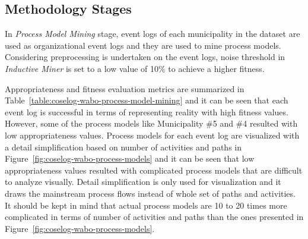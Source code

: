 \subsection{Methodology Stages}
\label{sec:coselog-methodology}
In \textit{Process Model Mining} stage, event logs of each municipality in the dataset are used as organizational event logs and they are used to mine process models. Considering preprocessing is undertaken on the event logs, noise threshold in \textit{Inductive Miner} is set to a low value of 10\% to achieve a higher fitness. 

Appropriateness and fitness evaluation metrics are summarized in Table~\ref{table:coselog-wabo-process-model-mining} and it can be seen that each event log is successful in terms of representing reality with high fitness values. However, some of the process models like Municipality \#5 and \#4 resulted with low appropriateness values. Process models for each event log are visualized with a detail simplification based on number of activities and paths in Figure~\ref{fig:coselog-wabo-process-models} and it can be seen that low appropriateness values resulted with complicated process models that are difficult to analyze visually. Detail simplification is only used for visualization and it draws the mainstream process flows instead of whole set of paths and activities. It should be kept in mind that actual process models are 10 to 20 times more complicated in terms of number of activities and paths than the ones presented in Figure~\ref{fig:coselog-wabo-process-models}. 
